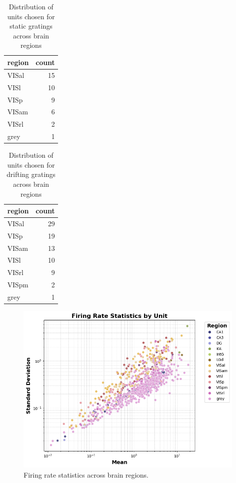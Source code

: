 \documentclass[10pt,twocolumn]{article}
\begin{document}
\begin{table}[h]
\centering
\begin{tabular}{lr}
\toprule
region & count \\
\midrule
VISal  & 15 \\
VISl   & 10 \\
VISp   &  9 \\
VISam  &  6 \\
VISrl  &  2 \\
grey   &  1 \\
\bottomrule
\end{tabular}
\caption{Distribution of units chosen for static gratings across brain regions}
\label{tab:chosen-regions-static}
\end{table}

\begin{table}[h]
\centering
\begin{tabular}{lr}
\toprule
region & count \\
\midrule
VISal  & 29 \\
VISp   & 19 \\
VISam  & 13 \\
VISl   & 10 \\
VISrl  &  9 \\
VISpm  &  2 \\
grey   &  1 \\
\bottomrule
\end{tabular}
\caption{Distribution of units chosen for drifting gratings across brain regions}
\label{tab:chosen-regions-drifting}
\end{table}


\begin{figure}[ht]
\centering
\includegraphics[width=\linewidth]{report_images/unit_firing_rate_statistics.png}
\caption{Firing rate statistics across brain regions.}
\label{fig:firing_rate_stats}
\end{figure}
\end{document}
